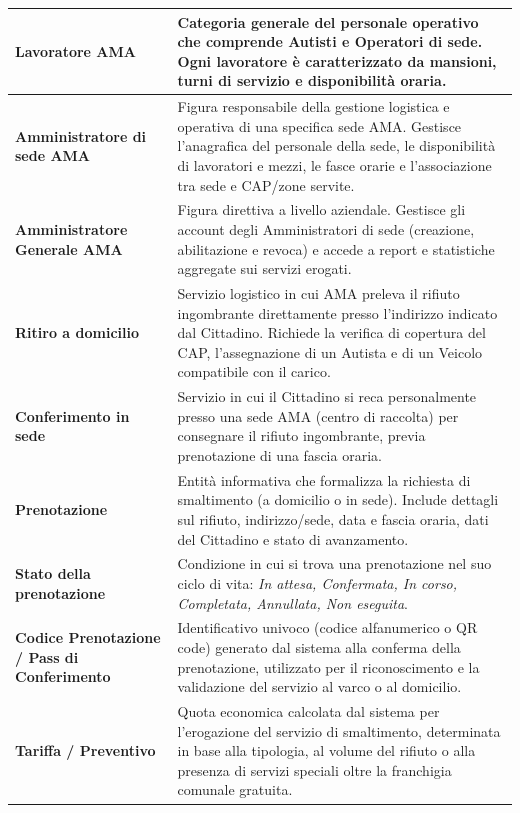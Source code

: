 \begin{center}
\begin{longtable}{|p{4.5cm}|p{11cm}|}
\textbf{Lavoratore AMA} & Categoria generale del personale operativo che comprende Autisti e Operatori di sede. Ogni lavoratore è caratterizzato da mansioni, turni di servizio e disponibilità oraria. \\ \hline

\textbf{Amministratore di sede AMA} & Figura responsabile della gestione logistica e operativa di una specifica sede AMA. Gestisce l'anagrafica del personale della sede, le disponibilità di lavoratori e mezzi, le fasce orarie e l'associazione tra sede e CAP/zone servite. \\ \hline

\textbf{Amministratore Generale AMA} & Figura direttiva a livello aziendale. Gestisce gli account degli Amministratori di sede (creazione, abilitazione e revoca) e accede a report e statistiche aggregate sui servizi erogati. \\ \hline

\textbf{Ritiro a domicilio} & Servizio logistico in cui AMA preleva il rifiuto ingombrante direttamente presso l'indirizzo indicato dal Cittadino. Richiede la verifica di copertura del CAP, l'assegnazione di un Autista e di un Veicolo compatibile con il carico. \\ \hline

\textbf{Conferimento in sede} & Servizio in cui il Cittadino si reca personalmente presso una sede AMA (centro di raccolta) per consegnare il rifiuto ingombrante, previa prenotazione di una fascia oraria. \\ \hline

\textbf{Prenotazione} & Entità informativa che formalizza la richiesta di smaltimento (a domicilio o in sede). Include dettagli sul rifiuto, indirizzo/sede, data e fascia oraria, dati del Cittadino e stato di avanzamento. \\ \hline

\textbf{Stato della prenotazione} & Condizione in cui si trova una prenotazione nel suo ciclo di vita: \textit{In attesa, Confermata, In corso, Completata, Annullata, Non eseguita}. \\ \hline

\textbf{Codice Prenotazione / Pass di Conferimento} & Identificativo univoco (codice alfanumerico o QR code) generato dal sistema alla conferma della prenotazione, utilizzato per il riconoscimento e la validazione del servizio al varco o al domicilio. \\ \hline

\textbf{Tariffa / Preventivo} & Quota economica calcolata dal sistema per l'erogazione del servizio di smaltimento, determinata in base alla tipologia, al volume del rifiuto o alla presenza di servizi speciali oltre la franchigia comunale gratuita. \\ \hline


\end{longtable}
\end{center}
